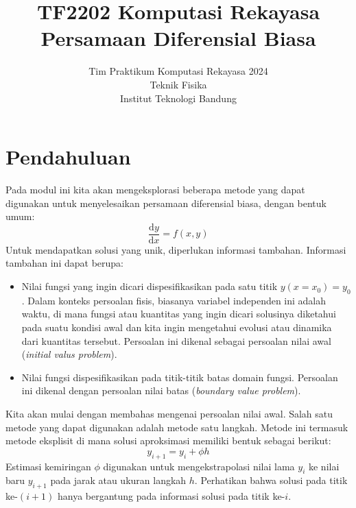



\title{%
{\small TF2202 Komputasi Rekayasa}\\
Persamaan Diferensial Biasa
}
\author{Tim Praktikum Komputasi Rekayasa 2024\\
Teknik Fisika\\
Institut Teknologi Bandung}
\date{}
\maketitle


\section*{Pendahuluan}
Pada modul ini kita akan mengeksplorasi beberapa metode yang
dapat digunakan untuk menyelesaikan persamaan diferensial biasa, dengan bentuk umum:
\begin{equation}
\frac{\mathrm{d}y}{\mathrm{d}x} = f(x,y)
\label{eq:dydx_umum}
\end{equation}
Untuk mendapatkan solusi yang unik, diperlukan informasi tambahan.
Informasi tambahan ini dapat berupa:
\begin{itemize}
\item Nilai fungsi yang ingin dicari dispesifikasikan pada satu titik $y(x=x_0)=y_0$.
Dalam konteks persoalan fisis, biasanya variabel independen ini adalah waktu, di mana
fungsi atau kuantitas yang ingin dicari solusinya diketahui pada suatu kondisi awal
dan kita ingin mengetahui evolusi atau dinamika dari kuantitas tersebut. Persoalan
ini dikenal sebagai persoalan nilai awal (\textit{initial valus problem}).
\item Nilai fungsi dispesifikasikan pada titik-titik batas domain fungsi.
Persoalan ini dikenal dengan persoalan nilai batas (\textit{boundary value problem}).
\end{itemize}

Kita akan mulai dengan membahas mengenai persoalan nilai awal. Salah satu metode yang
dapat digunakan adalah metode satu langkah. Metode ini termasuk metode eksplisit
di mana solusi aproksimasi memiliki bentuk sebagai berikut:
\begin{equation*}
y_{i+1} = y_{i} + \phi h
\end{equation*}
Estimasi kemiringan $\phi$ digunakan untuk mengekstrapolasi nilai lama
$y_{i}$ ke nilai baru $y_{i+1}$ pada jarak atau ukuran langkah $h$.
Perhatikan bahwa solusi pada titik ke-$(i+1)$ hanya bergantung pada informasi solusi
pada titik ke-$i$.


